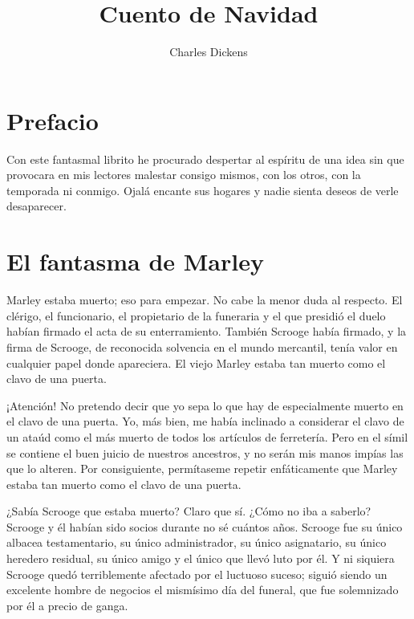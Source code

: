 \documentclass{novela}
\title{Cuento de Navidad}
\author{Charles Dickens}
\date{}
\begin{document}
\frontmatter
	\maketitle
	\tableofcontents
	\chapter{Prefacio}


 Con este fantasmal librito he procurado despertar al espíritu de una idea sin que provocara en mis lectores malestar consigo mismos, con los otros, con la temporada ni conmigo. Ojalá encante sus hogares y nadie sienta deseos de verle desaparecer.



 \mainmatter%
 \chapter{El fantasma de Marley}


 Marley estaba muerto; eso para empezar. No cabe la menor duda al respecto. El clérigo, el funcionario, el propietario de la funeraria y el que presidió el duelo habían firmado el acta de su enterramiento. También Scrooge había firmado, y la firma de Scrooge, de reconocida solvencia en el mundo mercantil, tenía valor en cualquier papel donde apareciera. El viejo Marley estaba tan muerto como el clavo de una puerta.

 ¡Atención! No pretendo decir que yo sepa lo que hay de especialmente muerto en el clavo de una puerta. Yo, más bien, me había inclinado a considerar el clavo de un ataúd como el más muerto de todos los artículos de ferretería. Pero en el símil se contiene el buen juicio de nuestros ancestros, y no serán mis manos impías las que lo alteren. Por consiguiente, permítaseme repetir enfáticamente que Marley estaba tan muerto como el clavo de una puerta.

 ¿Sabía Scrooge que estaba muerto? Claro que sí. ¿Cómo no iba a saberlo? Scrooge y él habían sido socios durante no sé cuántos años. Scrooge fue su único albacea testamentario, su único administrador, su único asignatario, su único heredero residual, su único amigo y el único que llevó luto por él. Y ni siquiera Scrooge quedó terriblemente afectado por el luctuoso suceso; siguió siendo un excelente hombre de negocios el mismísimo día del funeral, que fue solemnizado por él a precio de ganga.
\end{document}
